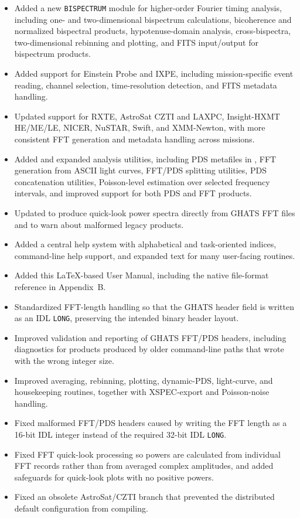 \begin{itemize}
\item Added a new \texttt{BISPECTRUM} module for higher-order Fourier timing
      analysis, including one- and two-dimensional bispectrum calculations,
      bicoherence and normalized bispectral products, hypotenuse-domain
      analysis, cross-bispectra, two-dimensional rebinning and plotting, and
      FITS input/output for bispectrum products.
\item Added support for Einstein Probe and IXPE, including mission-specific
      event reading, channel selection, time-resolution detection, and FITS
      metadata handling.
\item Updated support for RXTE, AstroSat CZTI and LAXPC, Insight-HXMT HE/ME/LE,
      NICER, NuSTAR, Swift, and XMM-Newton, with more consistent FFT generation
      and metadata handling across missions.
\item Added and expanded analysis utilities, including PDS metafiles in
      , FFT generation from ASCII light curves, FFT/PDS splitting
      utilities, PDS concatenation utilities, Poisson-level estimation over
      selected frequency intervals, and improved  support for
      both PDS and FFT products.
\item Updated  to produce quick-look power spectra directly
      from GHATS FFT files and to warn about malformed legacy products.
\item Added a central help system with alphabetical and task-oriented indices,
      command-line help support, and expanded  text for many
      user-facing routines.
\item Added this LaTeX-based User Manual, including the native file-format
      reference in Appendix~B.
\item Standardized FFT-length handling so that the GHATS  header
      field is written as an IDL \texttt{LONG}, preserving the intended binary
      header layout.
\item Improved validation and reporting of GHATS FFT/PDS headers, including
      diagnostics for products produced by older command-line paths that wrote
       with the wrong integer size.
\item Improved averaging, rebinning, plotting, dynamic-PDS, light-curve, and
      housekeeping routines, together with XSPEC-export and Poisson-noise
      handling.
\item Fixed malformed FFT/PDS headers caused by writing the FFT length as a
      16-bit IDL integer instead of the required 32-bit IDL \texttt{LONG}.
\item Fixed FFT quick-look processing so powers are calculated from individual
      FFT records rather than from averaged complex amplitudes, and added
      safeguards for quick-look plots with no positive powers.
\item Fixed an obsolete AstroSat/CZTI branch that prevented the distributed
      default configuration from compiling.
\end{itemize}

